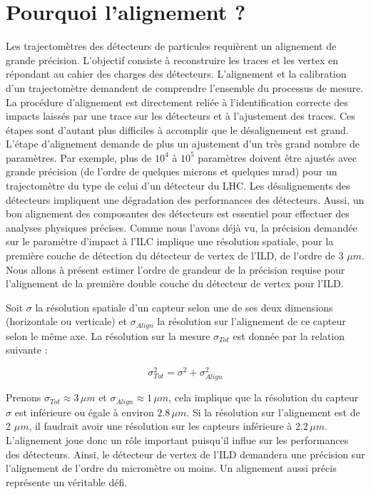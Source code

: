 
  \section{Pourquoi l'alignement ?}

  Les trajectom\`etres des d\'etecteurs de particules requi\`erent un alignement de grande pr\'ecision. L'objectif consiste \`a reconstruire les traces et les vertex en r\'epondant au cahier des charges des d\'etecteurs. L'alignement et la calibration d'un trajectom\`etre demandent de comprendre l'ensemble du processus de mesure. La proc\'edure d'alignement est directement reli\'ee \`a l'identification correcte des impacts laiss\'es par une trace sur les détecteurs et \`a l'ajustement des traces. Ces \'etapes sont d'autant plus difficiles \`a accomplir que le d\'esalignement est grand. L'\'etape d'alignement demande de plus un ajustement d'un tr\`es grand nombre de param\`etres. Par exemple, plus de $10^4$ \`a $10^5$ param\`etres doivent \^etre ajust\'es avec grande pr\'ecision (de l'ordre de quelques microns et quelques mrad) pour un trajectom\`etre du type de celui d'un détecteur du LHC. Les d\'esalignements des d\'etecteurs impliquent une d\'egradation des performances des d\'etecteurs. Aussi, un bon alignement des composantes des d\'etecteurs est essentiel pour effectuer des analyses physiques pr\'ecises. Comme nous l'avons d\'ejà vu, la précision demand\'ee sur le param\`etre d'impact \`a l'ILC implique une r\'esolution spatiale, pour la premi\`ere couche de d\'etection du d\'etecteur de vertex de l'ILD, de l'ordre de 3 $\mu m$. Nous allons \`a pr\'esent estimer l'ordre de grandeur de la pr\'ecision requise pour l'alignement de la premi\`ere double couche du d\'etecteur de vertex pour l'ILD.
  
  \medskip
  
  Soit $\sigma$ la r\'esolution spatiale d'un capteur selon une de ses deux dimensions (horizontale ou verticale) et $\sigma_{Align}$ la r\'esolution sur l'alignement de ce capteur selon le m\^eme axe. La r\'esolution sur la mesure $\sigma_{Tot}$ est donn\'ee par la relation suivante :
  
  \begin{equation}
   \sigma_{Tot}^2 = \sigma^2 + \sigma_{Align}^2
  \end{equation}

  Prenons $\sigma_{Tot} \approx 3 \, \mu m$ et $\sigma_{Align} \approx 1 \, \mu m$, cela implique que la r\'esolution du capteur $\sigma$ est inf\'erieure ou \'egale \`a environ $2.8 \, \mu m$. Si la r\'esolution sur l'alignement est de 2 $\mu m$, il faudrait avoir une r\'esolution sur les capteurs inf\'erieure \`a $2.2 \, \mu m$. L'alignement joue donc un r\^ole important puisqu'il influe sur les performances des d\'etecteurs. Ainsi, le d\'etecteur de vertex de l'ILD demandera une pr\'ecision sur l'alignement de l'ordre du microm\`etre ou moins. Un alignement aussi pr\'ecis représente un v\'eritable d\'efi.
  
